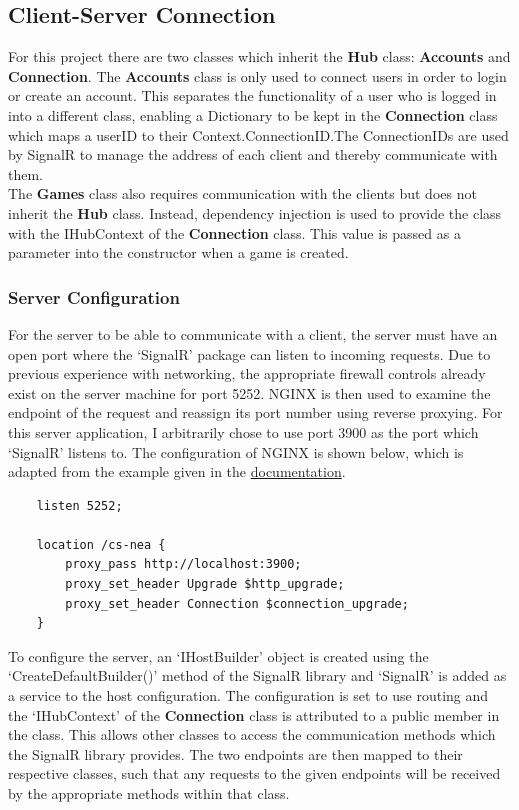 \documentclass{article}
\begin{document}
\subsection{Client-Server Connection}

For this project there are two classes which inherit the \textbf{Hub} class: \textbf{Accounts} and \textbf{Connection}. The \textbf{Accounts} class is only used to connect users in order to login or create an account. This separates the functionality of a user who is logged in into a different class, enabling a Dictionary to be kept in the \textbf{Connection} class which maps a userID to their Context.ConnectionID.\@ The ConnectionIDs are used by SignalR to manage the address of each client and thereby communicate with them. \\

The \textbf{Games} class also requires communication with the clients but does not inherit the \textbf{Hub} class. Instead, dependency injection is used to provide the class with the IHubContext of the \textbf{Connection} class. This value is passed as a parameter into the constructor when a game is created.

\subsubsection{Server Configuration}

For the server to be able to communicate with a client, the server must have an open port where the `SignalR' package can listen to incoming requests. Due to previous experience with networking, the appropriate firewall controls already exist on the server machine for port 5252. NGINX is then used to examine the endpoint of the request and reassign its port number using reverse proxying. For this server application, I arbitrarily chose to use port 3900 as the port which `SignalR' listens to. The configuration of NGINX is shown below, which is adapted from the example given in the \href{https://nginx.org/en/docs/example.html}{documentation}.

\begin{verbatim}
    listen 5252;
    
    location /cs-nea {
        proxy_pass http://localhost:3900;
        proxy_set_header Upgrade $http_upgrade;
        proxy_set_header Connection $connection_upgrade;
    }
\end{verbatim}

To configure the server, an `IHostBuilder' object is created using the `CreateDefaultBuilder()' method of the SignalR library and `SignalR' is added as a service to the host configuration. The configuration is set to use routing and the `IHubContext' of the \textbf{Connection} class is attributed to a public member in the class. This allows other classes to access the communication methods which the SignalR library provides. The two endpoints are then mapped to their respective classes, such that any requests to the given endpoints will be received by the appropriate methods within that class. \\
\end{document}
